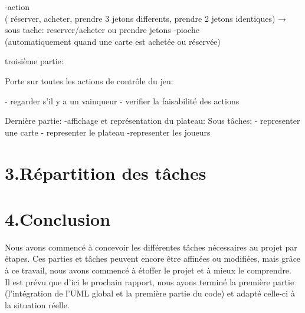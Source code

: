 \documentclass[a4paper]{article}
\begin{document}
-action \\
( réserver, acheter, prendre 3 jetons differents, prendre 2 jetons identiques)
    → sous tache: reserver/acheter ou prendre jetons
-pioche \\
(automatiquement quand une carte est achetée ou réservée)

troisième partie:

Porte sur toutes les actions de contrôle du jeu:

- regarder s’il y a un vainqueur
- verifier la faisabilité des actions

Dernière partie:
-affichage et représentation  du plateau:
 Sous tâches:
 - representer une carte
 - representer le plateau
 -representer les joueurs



\section*{3.Répartition des tâches}

\section*{4.Conclusion}
Nous avons commencé à concevoir les différentes tâches nécessaires au projet par étapes. Ces parties et tâches peuvent encore être affinées ou modifiées, mais grâce à ce travail, nous avons commencé à étoffer le projet et à mieux le comprendre.\\
 Il est prévu que d'ici le prochain rapport, nous ayons terminé la première partie (l'intégration de l'UML global et la première partie du code) et adapté celle-ci à la situation réelle.





\end{document}
